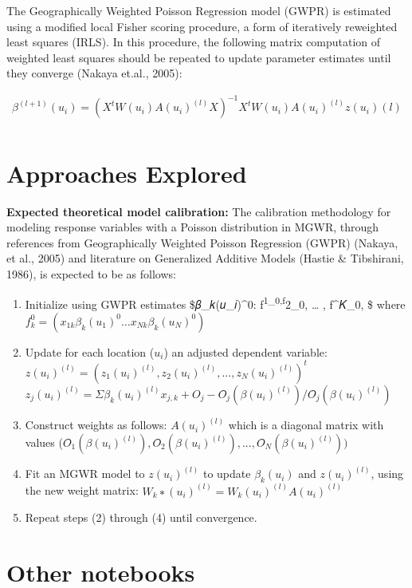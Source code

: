 \documentclass[11pt]{article}
\providecommand{\tightlist}{%
      \setlength{\itemsep}{0pt}\setlength{\parskip}{0pt}}
\begin{document}
The Geographically Weighted Poisson Regression model (GWPR) is estimated
using a modified local Fisher scoring procedure, a form of iteratively
reweighted least squares (IRLS). In this procedure, the following matrix
computation of weighted least squares should be repeated to update
parameter estimates until they converge (Nakaya et.al., 2005):

\begin{align}
\beta^{(l+1)} (u_i) = (X^{t} W (u_i) A(u_i)^{(l)} X)^{-1} X^{t} W (u_i) A (u_i) ^{(l)} z (u_i){(l)} \\
\end{align}

    \section{Approaches Explored}\label{approaches-explored}

    \textbf{Expected theoretical model calibration:} The calibration
methodology for modeling response variables with a Poisson distribution
in MGWR, through references from Geographically Weighted Poisson
Regression (GWPR) (Nakaya, et al., 2005) and literature on Generalized
Additive Models (Hastie \& Tibshirani, 1986), is expected to be as
follows:

    \begin{enumerate}
\def\labelenumi{\arabic{enumi}.}
\tightlist
\item
  Initialize using GWPR estimates \$𝛽\_𝑘(𝑢\_𝑖)\^{}0:
  f\textsuperscript{1\_0,f}2\_0, \ldots{} , f\^{}𝐾\_0, \$ where
  \(f_𝑘^0 = (𝑥_{1 𝑘}𝛽_𝑘(𝑢_1)^0 … 𝑥_{𝑁𝑘}𝛽_𝑘(𝑢_𝑁)^0)\)
\item
  Update for each location (\(𝑢_𝑖\)) an adjusted dependent variable:
  \(z(𝑢_𝑖)^{(𝑙)} = (z_1(𝑢_𝑖)^{(𝑙)}, z_2(𝑢_𝑖)^{(𝑙)}, … ,z_𝑁(𝑢_𝑖)^{(𝑙)})^𝑡\)
  \(z_𝑗(𝑢_𝑖)^{(𝑙)} = Σ𝛽_𝑘(𝑢_𝑖)^{(𝑙)} 𝑥_{𝑗,𝑘} + O_𝑗 − Ô_𝑗(𝛽(𝑢_𝑖)^{(𝑙)}) / Ô_𝑗(𝛽(𝑢_𝑖)^{(𝑙)})\)
\item
  Construct weights as follows: \(A(𝑢_𝑖)^{(𝑙)}\) which is a diagonal
  matrix with values
  (\(Ô_1(𝛽( 𝑢_𝑖)^{(𝑙)}), Ô_2(𝛽( 𝑢_𝑖)^{(𝑙)}), ... ,Ô_𝑁(𝛽(𝑢_𝑖)^{(𝑙)}))\)
\item
  Fit an MGWR model to \(z(𝑢_𝑖)^{(𝑙)}\) to update \(𝛽_𝑘(𝑢_𝑖)\) and
  \(z(𝑢_𝑖)^{(𝑙)}\), using the new weight matrix:
  \(𝑊_𝑘∗(𝑢_𝑖)^{(𝑙)}=𝑊_𝑘(𝑢_𝑖)^{(𝑙)} A(𝑢_𝑖)^{(𝑙)}\)
\item
  Repeat steps (2) through (4) until convergence.
\end{enumerate}

    \section{Other notebooks}\label{other-notebooks}
\end{document}
